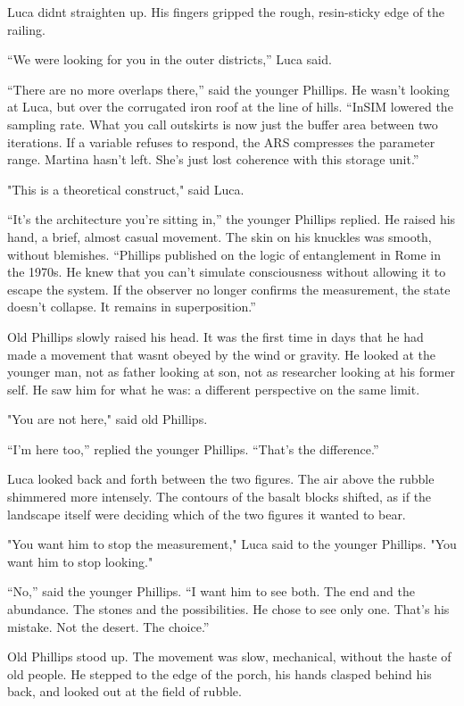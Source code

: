 \documentclass[
  ngerman,
]{article}
\begin{document}
Luca didn\textquotesingle t straighten up. His fingers gripped the
rough, resin-sticky edge of the railing.

``We were looking for you in the outer districts,'' Luca said.

``There are no more overlaps there,'' said the younger Phillips. He
wasn't looking at Luca, but over the corrugated iron roof at the line of
hills. ``InSIM lowered the sampling rate. What you call outskirts is now
just the buffer area between two iterations. If a variable refuses to
respond, the ARS compresses the parameter range. Martina hasn't left.
She's just lost coherence with this storage unit.''

"This is a theoretical construct," said Luca.

``It's the architecture you're sitting in,'' the younger Phillips
replied. He raised his hand, a brief, almost casual movement. The skin
on his knuckles was smooth, without blemishes. ``Phillips published on
the logic of entanglement in Rome in the 1970s. He knew that you can't
simulate consciousness without allowing it to escape the system. If the
observer no longer confirms the measurement, the state doesn't collapse.
It remains in superposition.''

Old Phillips slowly raised his head. It was the first time in days that
he had made a movement that wasn\textquotesingle t obeyed by the wind or
gravity. He looked at the younger man, not as father looking at son, not
as researcher looking at his former self. He saw him for what he was: a
different perspective on the same limit.

"You are not here," said old Phillips.

``I'm here too,'' replied the younger Phillips. ``That's the
difference.''

Luca looked back and forth between the two figures. The air above the
rubble shimmered more intensely. The contours of the basalt blocks
shifted, as if the landscape itself were deciding which of the two
figures it wanted to bear.

"You want him to stop the measurement," Luca said to the younger
Phillips. "You want him to stop looking."

``No,'' said the younger Phillips. ``I want him to see both. The end and
the abundance. The stones and the possibilities. He chose to see only
one. That's his mistake. Not the desert. The choice.''

Old Phillips stood up. The movement was slow, mechanical, without the
haste of old people. He stepped to the edge of the porch, his hands
clasped behind his back, and looked out at the field of rubble.
\end{document}
